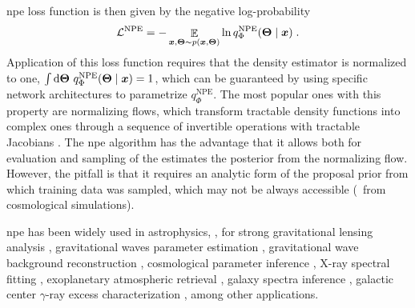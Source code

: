 \Gls*{npe} loss function is then given by the negative log-probability
%
\begin{equation} \label{eq:lnpe}
	\mathcal{L}^\text{NPE}=-\mathop{\mathbb{E}}\limits_{\bm{x}, \bm{\Theta} \sim p(\bm{x}, \bm{\Theta})} \ln q^\text{NPE}_\Phi(\bm{\Theta} \mid \bm{x}) \;.
\end{equation}
%
Application of this loss function requires that the density estimator is normalized to one, $\int \dd\bm{\Theta}\ q^\text{NPE}_\Phi(\bm{\Theta} \mid \bm{x})=1$, which can be guaranteed by using specific network architectures to parametrize $q^\text{NPE}_\Phi$. The most popular ones with this property are normalizing flows, which transform tractable density functions into complex ones through a sequence of invertible operations with tractable Jacobians \cite{kobyzev2020normalizing, papamakarios2021normalizing}. The \gls*{npe} algorithm has the advantage that it allows both for evaluation and sampling of the estimates the posterior from the normalizing flow. However, the pitfall is that it requires an analytic form of the proposal prior from which training data was sampled, which may not be always accessible (\eg\ from cosmological simulations).

\Gls*{npe} has been widely used in astrophysics, \eg, for strong gravitational lensing analysis \cite{Wagner-Carena:2020yun, Wagner-Carena:2022mrn, wagnercarena2024strong}, gravitational waves parameter estimation \cite{Dax:2021tsq, Crisostomi:2023tle, kolmus2024tuning}, gravitational wave background reconstruction \cite{Dimitriou:2023knw}, cosmological parameter inference \cite{Tucci:2023bag}, X-ray spectral fitting \cite{Barret:2024kvc}, exoplanetary atmospheric retrieval \cite{vasist2023neural}, galaxy spectra inference \cite{Hahn:2022nda, khullar2022digs}, galactic center $\gamma$-ray excess characterization \cite{Mishra-Sharma:2021oxe, Christy:2024hou}, among other applications.

